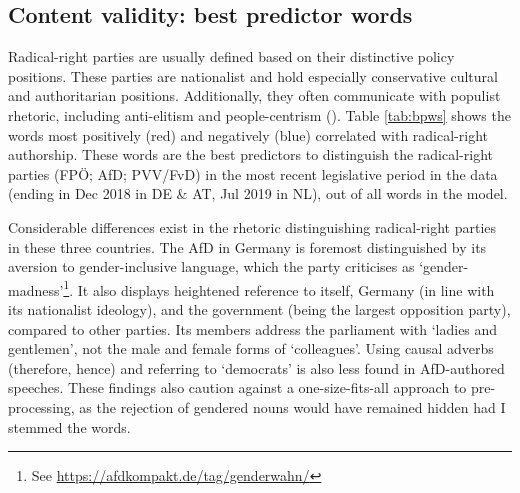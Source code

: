 \documentclass{article}
\begin{document}
\subsection{Content validity: best predictor words}

Radical-right parties are usually defined based on their distinctive policy positions. These parties are nationalist and hold especially conservative cultural and authoritarian positions. Additionally, they often communicate with populist rhetoric, including anti-elitism and people-centrism (\cite{Mudde2007}). Table \ref{tab:bpws} shows the words most positively (red) and negatively (blue) correlated with radical-right authorship. These words are the best predictors to distinguish the radical-right parties (FPÖ; AfD; PVV/FvD) in the most recent legislative period in the data (ending in Dec 2018 in DE \& AT, Jul 2019 in NL), out of all words in the model. \par

Considerable differences exist in the rhetoric distinguishing radical-right parties in these three countries. The AfD in Germany is foremost distinguished by its aversion to gender-inclusive language, which the party criticises as ‘gender-madness’\footnote{See \url{https://afdkompakt.de/tag/genderwahn/}}. It also displays heightened reference to itself, Germany (in line with its nationalist ideology), and the government (being the largest opposition party), compared to other parties. Its members address the parliament with ‘ladies and gentlemen’, not the male and female forms of ‘colleagues’. Using causal adverbs (therefore, hence) and referring to ‘democrats’ is also less found in AfD-authored speeches. These findings also caution against a one-size-fits-all approach to pre-processing, as the rejection of gendered nouns would have remained hidden had I stemmed the words. \par
\end{document}
